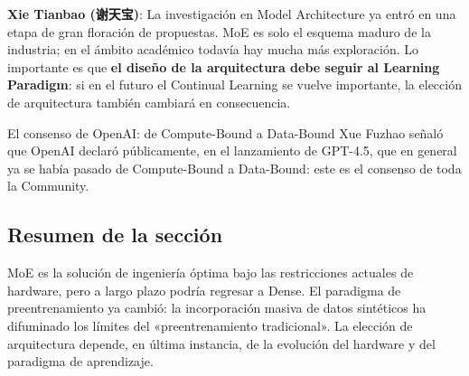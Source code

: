 \textbf{Xie Tianbao (谢天宝)}: La investigación en Model Architecture ya entró en una etapa de gran floración de propuestas. MoE es solo el esquema maduro de la industria; en el ámbito académico todavía hay mucha más exploración. Lo importante es que \textbf{el diseño de la arquitectura debe seguir al Learning Paradigm}: si en el futuro el Continual Learning se vuelve importante, la elección de arquitectura también cambiará en consecuencia.

\begin{warningbox}{El consenso de OpenAI: de Compute-Bound a Data-Bound}
Xue Fuzhao señaló que OpenAI declaró públicamente, en el lanzamiento de GPT-4.5, que en general ya se había pasado de Compute-Bound a Data-Bound: este es el consenso de toda la Community.
\end{warningbox}

\subsection{Resumen de la sección}
MoE es la solución de ingeniería óptima bajo las restricciones actuales de hardware, pero a largo plazo podría regresar a Dense. El paradigma de preentrenamiento ya cambió: la incorporación masiva de datos sintéticos ha difuminado los límites del «preentrenamiento tradicional». La elección de arquitectura depende, en última instancia, de la evolución del hardware y del paradigma de aprendizaje.

